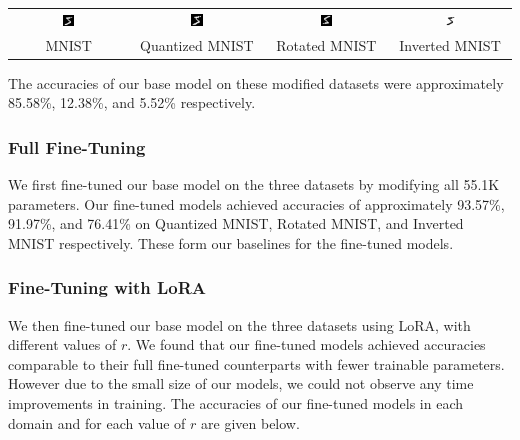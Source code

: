 \documentclass{article}
\begin{document}
\begin{center}
    \begin{tabular}{c c c c}
		\includegraphics[width=0.1\textwidth]{images/normal_5.png} & \includegraphics[width=0.1\textwidth]{images/quantized_5.png} & \includegraphics[width=0.1\textwidth]{images/rotated_5.png} & \includegraphics[width=0.1\textwidth]{images/inverted_5.png} \\
		MNIST & Quantized MNIST & Rotated MNIST & Inverted MNIST
    \end{tabular}
\end{center}

The accuracies of our base model on these modified datasets were approximately 85.58\%, 12.38\%, and 5.52\% respectively.


\subsubsection{Full Fine-Tuning}
We first fine-tuned our base model on the three datasets by modifying all 55.1K parameters. Our fine-tuned models achieved accuracies of approximately 93.57\%, 91.97\%, and 76.41\% on Quantized MNIST, Rotated MNIST, and Inverted MNIST respectively. These form our baselines for the fine-tuned models.

\subsubsection{Fine-Tuning with LoRA}
We then fine-tuned our base model on the three datasets using LoRA, with different values of $r$. We found that our fine-tuned models achieved accuracies comparable to their full fine-tuned counterparts with fewer trainable parameters. However due to the small size of our models, we could not observe any time improvements in training. The accuracies of our fine-tuned models in each domain and for each value of $r$ are given below.
\end{document}
